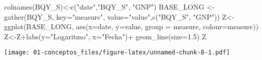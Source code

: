 \documentclass[
]{book}
\newenvironment{Shaded}{\begin{snugshade}}{\end{snugshade}}
\newcommand{\AttributeTok}[1]{\textcolor[rgb]{0.77,0.63,0.00}{#1}}
\newcommand{\FloatTok}[1]{\textcolor[rgb]{0.00,0.00,0.81}{#1}}
\newcommand{\FunctionTok}[1]{\textcolor[rgb]{0.00,0.00,0.00}{#1}}
\newcommand{\NormalTok}[1]{#1}
\newcommand{\OtherTok}[1]{\textcolor[rgb]{0.56,0.35,0.01}{#1}}
\newcommand{\SpecialCharTok}[1]{\textcolor[rgb]{0.00,0.00,0.00}{#1}}
\newcommand{\StringTok}[1]{\textcolor[rgb]{0.31,0.60,0.02}{#1}}
\begin{document}
\begin{Shaded}
\begin{Highlighting}[]
\FunctionTok{colnames}\NormalTok{(BQY\_S)}\OtherTok{\textless{}{-}}\FunctionTok{c}\NormalTok{(}\StringTok{"date"}\NormalTok{,}\StringTok{"BQY\_S"}\NormalTok{, }\StringTok{"GNP"}\NormalTok{)}
\NormalTok{BASE\_LONG }\OtherTok{\textless{}{-}} \FunctionTok{gather}\NormalTok{(BQY\_S, }\AttributeTok{key=}\StringTok{"measure"}\NormalTok{, }\AttributeTok{value=}\StringTok{"value"}\NormalTok{,}\FunctionTok{c}\NormalTok{(}\StringTok{"BQY\_S"}\NormalTok{, }\StringTok{"GNP"}\NormalTok{))}
\NormalTok{Z}\OtherTok{\textless{}{-}}\FunctionTok{ggplot}\NormalTok{(BASE\_LONG, }\FunctionTok{aes}\NormalTok{(}\AttributeTok{x=}\NormalTok{date, }\AttributeTok{y=}\NormalTok{value, }\AttributeTok{group =}\NormalTok{ measure,}
                         \AttributeTok{colour=}\NormalTok{measure))}
\NormalTok{Z}\OtherTok{\textless{}{-}}\NormalTok{Z}\SpecialCharTok{+}\FunctionTok{labs}\NormalTok{(}\AttributeTok{y=}\StringTok{"Logaritmo"}\NormalTok{,}
          \AttributeTok{x=}\StringTok{"Fecha"}\NormalTok{)}\SpecialCharTok{+}
  \FunctionTok{geom\_line}\NormalTok{(}\AttributeTok{size=}\FloatTok{1.5}\NormalTok{)}
\NormalTok{Z}
\end{Highlighting}
\end{Shaded}

\texttt{[image: 01-conceptos\_files/figure-latex/unnamed-chunk-8-1.pdf]}
\end{document}
